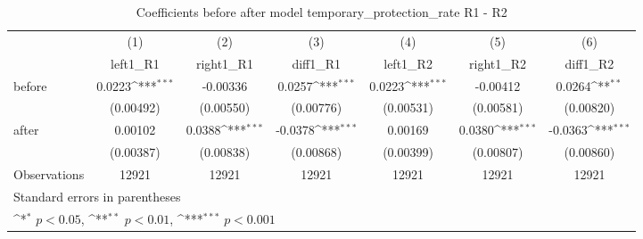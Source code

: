 \begin{table}[htbp]\centering
\def\sym#1{\ifmmode^{#1}\else\(^{#1}\)\fi}
\caption{Coefficients before after model temporary\_protection\_rate R1 - R2}
\begin{tabular}{l*{6}{c}}
\hline\hline
                    &\multicolumn{1}{c}{(1)}&\multicolumn{1}{c}{(2)}&\multicolumn{1}{c}{(3)}&\multicolumn{1}{c}{(4)}&\multicolumn{1}{c}{(5)}&\multicolumn{1}{c}{(6)}\\
                    &\multicolumn{1}{c}{left1\_R1}&\multicolumn{1}{c}{right1\_R1}&\multicolumn{1}{c}{diff1\_R1}&\multicolumn{1}{c}{left1\_R2}&\multicolumn{1}{c}{right1\_R2}&\multicolumn{1}{c}{diff1\_R2}\\
\hline
before              &      0.0223\sym{***}&    -0.00336         &      0.0257\sym{***}&      0.0223\sym{***}&    -0.00412         &      0.0264\sym{**} \\
                    &   (0.00492)         &   (0.00550)         &   (0.00776)         &   (0.00531)         &   (0.00581)         &   (0.00820)         \\
[1em]
after               &     0.00102         &      0.0388\sym{***}&     -0.0378\sym{***}&     0.00169         &      0.0380\sym{***}&     -0.0363\sym{***}\\
                    &   (0.00387)         &   (0.00838)         &   (0.00868)         &   (0.00399)         &   (0.00807)         &   (0.00860)         \\
\hline
Observations        &       12921         &       12921         &       12921         &       12921         &       12921         &       12921         \\
\hline\hline
\multicolumn{7}{l}{\footnotesize Standard errors in parentheses}\\
\multicolumn{7}{l}{\footnotesize \sym{*} \(p<0.05\), \sym{**} \(p<0.01\), \sym{***} \(p<0.001\)}\\
\end{tabular}
\end{table}
